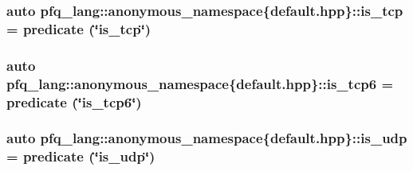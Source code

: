 \hypertarget{namespacepfq__lang_1_1anonymous__namespace_02default_8hpp_03_a219c50fd572a25336a32e00cf527c565}{
\subsubsection[{is\+\_\+tcp}]{\setlength{\rightskip}{0pt plus 5cm}auto pfq\+\_\+lang\+::anonymous\+\_\+namespace\{default.\+hpp\}\+::is\+\_\+tcp = {\bf predicate} (\char`\"{}is\+\_\+tcp\char`\"{})}}\label{namespacepfq__lang_1_1anonymous__namespace_02default_8hpp_03_a219c50fd572a25336a32e00cf527c565}
\hypertarget{namespacepfq__lang_1_1anonymous__namespace_02default_8hpp_03_a096d3a0faa81e83be5cfeb025526275d}{
\subsubsection[{is\+\_\+tcp6}]{\setlength{\rightskip}{0pt plus 5cm}auto pfq\+\_\+lang\+::anonymous\+\_\+namespace\{default.\+hpp\}\+::is\+\_\+tcp6 = {\bf predicate} (\char`\"{}is\+\_\+tcp6\char`\"{})}}\label{namespacepfq__lang_1_1anonymous__namespace_02default_8hpp_03_a096d3a0faa81e83be5cfeb025526275d}
\hypertarget{namespacepfq__lang_1_1anonymous__namespace_02default_8hpp_03_a120b37089690955fc25203beb98f0fe7}{
\subsubsection[{is\+\_\+udp}]{\setlength{\rightskip}{0pt plus 5cm}auto pfq\+\_\+lang\+::anonymous\+\_\+namespace\{default.\+hpp\}\+::is\+\_\+udp = {\bf predicate} (\char`\"{}is\+\_\+udp\char`\"{})}}\label{namespacepfq__lang_1_1anonymous__namespace_02default_8hpp_03_a120b37089690955fc25203beb98f0fe7}
